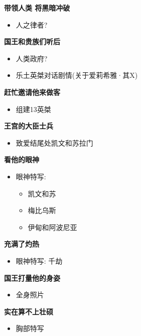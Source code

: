 \documentclass[a4paper]{article}
\begin{document}
\textbf{带领人类 将黑暗冲破}

\begin{itemize}
    \item 人之律者?
\end{itemize}

\textbf{国王和贵族们听后}

\begin{itemize}
    \item 人类政府?
    \item 乐土英桀对话剧情(关于爱莉希雅·其X)
\end{itemize}

\textbf{赶忙邀请他来做客}

\begin{itemize}
    \item 组建13英桀
\end{itemize}

\textbf{王宫的大臣士兵}

\begin{itemize}
    \item 致爱结尾处凯文和苏拉门
\end{itemize}

\textbf{看他的眼神}

\begin{itemize}
    \item 眼神特写:
    \begin{itemize}
        \item 凯文和苏
        \item 梅比乌斯
        \item 伊甸和阿波尼亚
    \end{itemize}
\end{itemize}

\textbf{充满了灼热}

\begin{itemize}
    \item 眼神特写: 千劫
\end{itemize}

\textbf{国王打量他的身姿}

\begin{itemize}
    \item 全身照片
\end{itemize}

\textbf{实在算不上壮硕}

\begin{itemize}
    \item 胸部特写
\end{itemize}
\end{document}
